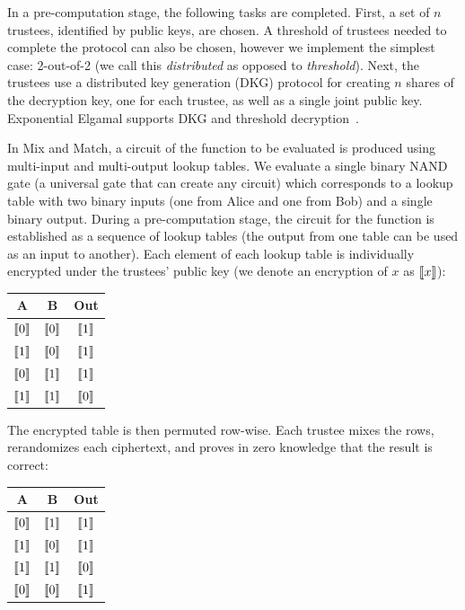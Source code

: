 In a pre-computation stage, the following tasks are completed. First, a set of $n$ trustees, identified by public keys, are chosen. A threshold of trustees needed to complete the protocol can also be chosen, however we implement the simplest case: 2-out-of-2 (we call this \emph{distributed} as opposed to \emph{threshold}). Next, the trustees use a distributed key generation (DKG) protocol for creating $n$ shares of the decryption key, one for each trustee, as well as a single joint public key. Exponential Elgamal supports DKG and threshold decryption~\cite{Ped91a}.

In Mix and Match, a circuit of the function to be evaluated is produced using multi-input and multi-output lookup tables. We evaluate a single binary NAND gate (a universal gate that can create any circuit) which corresponds to a lookup table with two binary inputs (one from Alice and one from Bob) and a single binary output. During a pre-computation stage, the circuit for the function is established as a sequence of lookup tables (the output from one table can be used as an input to another). Each element of each lookup table is individually encrypted under the trustees' public key (we denote an encryption of $x$ as $\llbracket x \rrbracket$):

\begin{center}
\begin{tabular}{|c|c|c|}
  \hline
  A			& 	B			& 	Out   			\\ \hline
  $\llbracket 0 \rrbracket$ 	&	$\llbracket 0 \rrbracket$ 	& 	$\llbracket 1 \rrbracket$ 	\\ \hline
  $\llbracket 1 \rrbracket$ 	&	$\llbracket 0 \rrbracket$ 	&  	$\llbracket 1 \rrbracket$ 	\\ \hline
  $\llbracket 0 \rrbracket$ 	&	$\llbracket 1 \rrbracket$ 	& 	$\llbracket 1 \rrbracket$ 	\\ \hline
  $\llbracket 1 \rrbracket$ 	&	$\llbracket 1 \rrbracket$ 	&  	$\llbracket 0 \rrbracket$ 	\\ \hline
\end{tabular}
\end{center}

The encrypted table is then permuted row-wise. Each trustee mixes the rows, rerandomizes each ciphertext, and proves in zero knowledge that the result is correct: 

\begin{center}
\begin{tabular}{|c|c|c|}
  \hline
  A			& 	B			& 	Out   			\\ \hline
  $\llbracket 0 \rrbracket$ 	&	$\llbracket 1 \rrbracket$ 	& 	$\llbracket 1 \rrbracket$ 	\\ \hline
  $\llbracket 1 \rrbracket$ 	&	$\llbracket 0 \rrbracket$ 	&  	$\llbracket 1 \rrbracket$ 	\\ \hline
  $\llbracket 1 \rrbracket$ 	&	$\llbracket 1 \rrbracket$ 	&  	$\llbracket 0 \rrbracket$ 	\\ \hline
  $\llbracket 0 \rrbracket$ 	&	$\llbracket 0 \rrbracket$ 	& 	$\llbracket 1 \rrbracket$ 	\\ \hline
\end{tabular}
\end{center}

